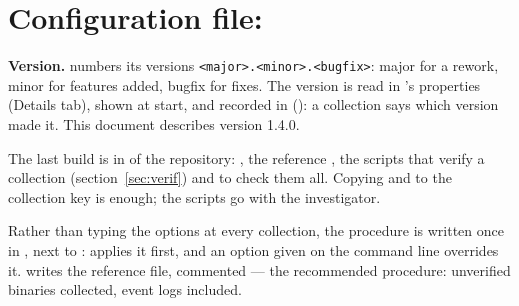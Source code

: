 \documentclass[11pt,a4paper,oneside]{report}
\begin{document}
\section{Configuration file: }

\textbf{Version.} \wac{} numbers its versions \texttt{<major>.<minor>.<bugfix>}:
major for a rework, minor for features added, bugfix for fixes. The version
is read in 's properties (Details tab), shown at start, and
recorded in  (): a collection
says which version made it. This document describes version 1.4.0.

The last build is in  of the repository: ,
the reference , the scripts that verify a collection
(section~\ref{sec:verif}) and  to check them all.
Copying  and  to the collection key is
enough; the scripts go with the investigator.

Rather than typing the options at every collection, the procedure is written
once in , next to : \wac{} applies it
first, and an option given on the command line overrides it.
 writes the reference file, commented — the recommended
procedure: unverified binaries collected, event logs included.
\end{document}
